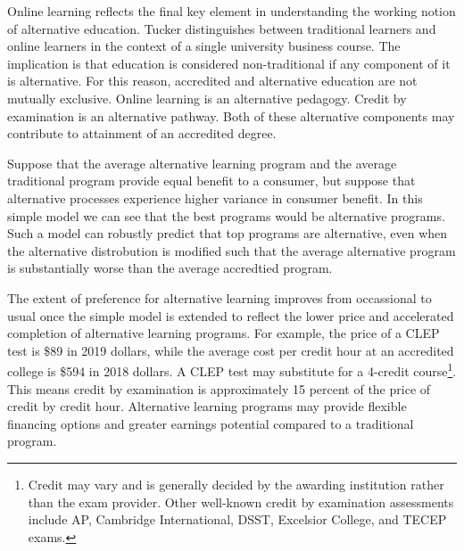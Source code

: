 \documentclass[AER]{./aea-latex-templates/AEA}
\begin{document}
        Online learning reflects the final key element in understanding the working notion of
        alternative education. Tucker\cite{tucker2001distance} distinguishes between traditional
        learners and online learners in the context of a single university business course.
        The implication is that education is considered non-traditional if any component of it
        is alternative. For this reason, accredited and alternative education are not mutually exclusive.
        Online learning is an alternative pedagogy. Credit by examination is an alternative
        pathway. Both of these alternative components may contribute to attainment of an accredited degree.
        
        Suppose that the average alternative learning program and the average traditional program
        provide equal benefit to a consumer, but suppose that alternative
        processes experience higher variance in consumer benefit. In this
        simple model we can see that the best programs would be alternative
        programs. Such a model can robustly predict that top programs are
        alternative, even when the alternative distrobution is modified such
        that the average alternative program is substantially worse than the
        average accredtied program.
        
        The extent of preference for alternative learning improves from
        occassional to usual once the simple model is extended to reflect the
        lower price and accelerated completion of alternative learning programs.
        For example, the price of a CLEP test is \$89 in 2019 dollars\cite{collegeboard_2019}, while
        the average cost per credit hour at an accredited college is \$594 in 2018
        dollars\cite{kirkham2018study}. A CLEP test may substitute for a 4-credit course\footnote{Credit
        may vary and is generally decided by the awarding institution rather than
        the exam provider. Other well-known credit by examination assessments include AP, Cambridge International, DSST, Excelsior
        College, and TECEP exams.}. This means credit by examination is approximately 15 percent of the price of credit by credit hour.
        Alternative learning programs may provide flexible financing options and greater earnings potential compared to a traditional program.
        
\end{document}
